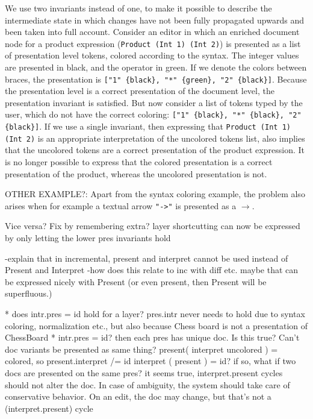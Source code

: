 \bc
We use two invariants instead of one, to make it possible to describe the intermediate state in which changes have not been fully propagated upwards and been taken into full account. Consider an editor in which an enriched document node for a product expression (\verb|Product (Int 1) (Int 2)|) is presented as a list of presentation level tokens, colored according to the syntax. The integer values are presented in black, and the operator in green. If we denote the colors between braces, the presentation is \verb|["1" {black}, "*" {green}, "2" {black}]|. Because the presentation level is a correct presentation of the document level, the presentation invariant is satisfied. But now consider a list of tokens typed by the user, which do not have the correct coloring: \verb|["1" {black}, "*" {black}, "2" {black}]|. If we use a single invariant, then expressing that \verb|Product (Int 1) (Int 2)| is an appropriate interpretation of the uncolored tokens list, also implies that the uncolored tokens are a correct presentation of the product expression. It is no longer possible to express that the colored presentation is a correct presentation of the product, whereas the uncolored presentation is not.  \ec



\bc

OTHER EXAMPLE?: Apart from the syntax coloring example, the problem also arises when for example a textual arrow 
\verb|"->"| is presented as a $\rightarrow$. 

Vice versa? Fix by remembering extra?
 layer shortcutting can now be expressed by only letting the lower pres invariants hold

 -explain that in incremental, present and interpret cannot be used instead of Present and Interpret
 -how does this relate to inc with diff etc. maybe that can be expressed nicely with Present
 (or even present, then Present will be superfluous.)

* does   intr.pres = id hold for a layer? pres.intr never needs to hold due to syntax coloring, normalization etc., but also because Chess board is not a presentation of ChessBoard   
* intr.pres = id? then each pres has unique doc. Is this true? Can't doc variants be presented as same thing?
   present( interpret uncolored ) = colored, so present.interpret /= id
   interpret ( present ) = id? if so, what if two docs are presented on the same pres?
 it seems true, interpret.present cycles should not alter the doc. In case of ambiguity, the system should
 take care of conservative behavior. On an edit, the doc may change, but that's not a (interpret.present) cycle

